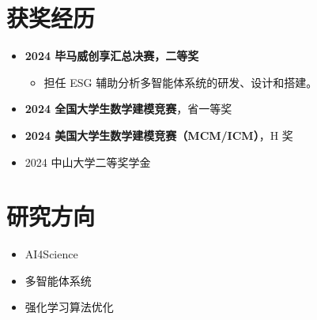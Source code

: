 \documentclass[11pt]{article}
\newlength{\iconwidth}
\begin{document}
    \noindent\begin{minipage}[t]{0.53\textwidth}
        \vspace{0pt}
        \section[获奖经历]{\makebox[\iconwidth][c]{\color{primary_color}{\faStar}}\quad 获奖经历}
        \begin{itemize}
        \setlength{\itemsep}{0.5em}
            \item \textbf{2024 毕马威创享汇总决赛，二等奖}
            \begin{itemize}[leftmargin=1.8em]
                \item 担任 ESG 辅助分析多智能体系统的研发、设计和搭建。
            \end{itemize}
            \item \textbf{2024 全国大学生数学建模竞赛}，省一等奖
            \item \textbf{2024 美国大学生数学建模竞赛（MCM/ICM）}，H 奖
            \item 2024 中山大学二等奖学金
        \end{itemize}

        \vspace{0.3em}
        \section[研究方向]{\makebox[\iconwidth][c]{\color{primary_color}{\faCompass}}\quad 研究方向}
        \begin{itemize}
        \setlength{\itemsep}{0.5em}
            \item AI4Science
            \item 多智能体系统
            \item 强化学习算法优化
        \end{itemize}
    \end{minipage}\hfill%
\end{document}
